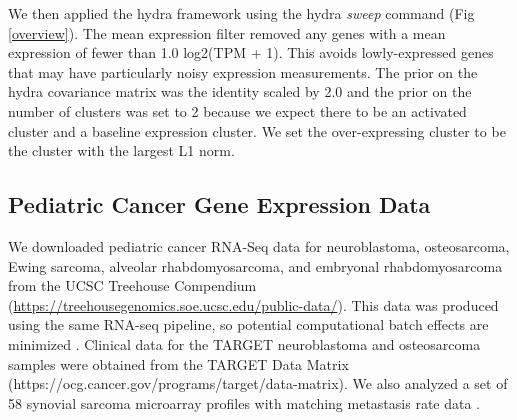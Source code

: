 \documentclass[10pt,letterpaper]{article}
\begin{document}
We then applied the hydra framework using the hydra \textit{sweep} command (Fig \ref{overview}). The mean expression filter removed any genes with a mean expression of fewer than 1.0 log2(TPM + 1). This avoids lowly-expressed genes that may have particularly noisy expression measurements. The prior on the hydra covariance matrix was the identity scaled by 2.0 and the prior on the number of clusters was set to 2 because we expect there to be an activated cluster and a baseline expression cluster. We set the over-expressing cluster to be the cluster with the largest L1 norm.
 

\subsection*{Pediatric Cancer Gene Expression Data}
We downloaded pediatric cancer RNA-Seq data for neuroblastoma, osteosarcoma, Ewing sarcoma, alveolar rhabdomyosarcoma, and embryonal rhabdomyosarcoma from the UCSC Treehouse Compendium (\url{https://treehousegenomics.soe.ucsc.edu/public-data/}). This data was produced using the same RNA-seq pipeline, so potential computational batch effects are minimized \cite{vivianToilEnablesReproducible2017,vaskeComparativeTumorRNA2019}. Clinical data for the TARGET neuroblastoma and osteosarcoma samples were obtained from the TARGET Data Matrix (https://ocg.cancer.gov/programs/target/data-matrix). We also analyzed a set of 58 synovial sarcoma microarray profiles with matching metastasis rate data \cite{lagardeChromosomeInstabilityAccounts2013}.
 
\end{document}
